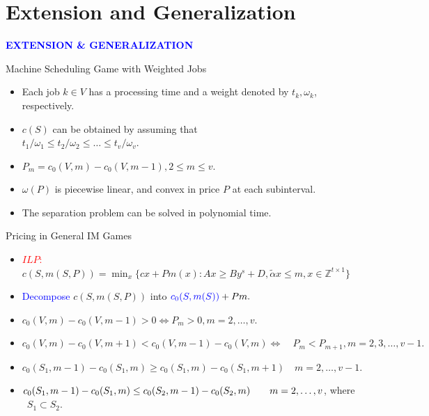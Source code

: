 \documentclass[14pt]{beamer}
\begin{document}
\section{Extension and Generalization}
\begin{frame}
\centering
\large
\textcolor{blue}{\bf {\huge E}XTENSION \&  {\huge G}ENERALIZATION}
\end{frame}

\begin{frame}{Machine Scheduling Game with Weighted Jobs}
	\begin{itemize}
	\justifying
		\item Each job $k \in V$ has a processing time and a weight denoted by $t_k,\omega_k$, respectively.
		\vspace{2pt}
		\item $c(S)$ can be obtained by assuming that\\
		\quad $t_1/\omega_1 \leq t_2/\omega_2 \leq \ldots \leq t_v/\omega_v$.
		\vspace{2pt}
		\item $P_m = c_0(V,m)- c_0(V,m-1), 2 \leq m \leq v$.
		\item ${\omega(P)}$ is piecewise linear, and convex in price $P$ at each subinterval.
		\vspace{2pt}
		\item The separation problem can be solved in polynomial time.
\end{itemize}
\end{frame}

\begin{frame}{Pricing in General IM Games}
	\begin{itemize}
	\justifying
		\item \textcolor{red}{$ILP:$}
		$c(S,m(S,P))= \mathop{\min}_{x} \{ cx+Pm(x): Ax \geq By^s+D, \tilde{\alpha}x \leq m, x \in \mathbb{Z}^{t \times 1} \}$
		\vspace{2pt}
		\item \textcolor{blue}{Decompose} $c(S,m(S,P))$ into $\textcolor{blue}{c_0(S,m(S))}+Pm.$
		\vspace{2pt}
		\item $c_0(V,m)- c_0(V,m-1) > 0 \Leftrightarrow P_m > 0, m=2,\ldots,v.$
		\item $c_0 (V,m) - c_0 (V,m+1) < c_0 (V,m-1) - c_0 (V,m) \Leftrightarrow \quad P_m < P_{m+1} , m=2,3,\ldots,v-1.$
		\vspace{3pt}
		\footnotesize
		\item $c_0(S_1,m-1)-c_0(S_1,m) \geq
  c_0(S_1,m)-c_0(S_1,m+1) \quad m=2,\ldots,v-1.$
		\item $	c_0(S_1,m-1)-c_0(S_1,m) \leq
	  c_0(S_2,m-1)-c_0(S_2,m) \\
		\quad \quad m=2,\ldots,v$, where ~$S_1 \subset S_2$.
	\end{itemize}
\end{frame}
\end{document}
